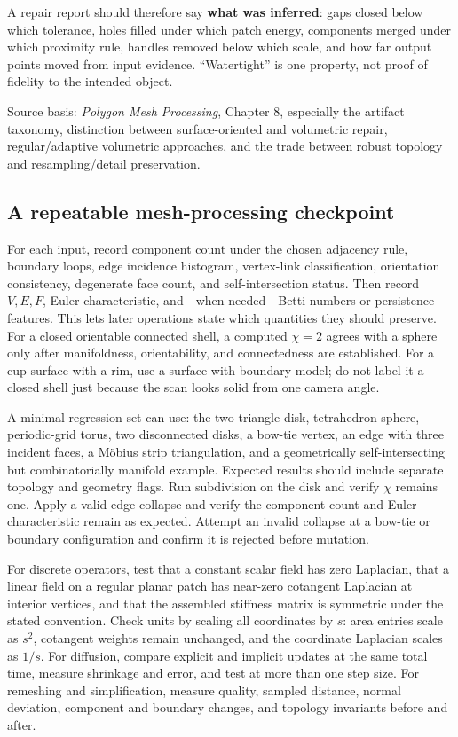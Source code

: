 A repair report should therefore say \textbf{what was inferred}: gaps closed below which tolerance, holes filled under which patch energy, components merged under which proximity rule, handles removed below which scale, and how far output points moved from input evidence. ``Watertight'' is one property, not proof of fidelity to the intended object.

Source basis: \emph{Polygon Mesh Processing}, Chapter 8, especially the artifact taxonomy, distinction between surface-oriented and volumetric repair, regular/adaptive volumetric approaches, and the trade between robust topology and resampling/detail preservation.

\subsection{A repeatable mesh-processing checkpoint}\label{03-visual-computing-i-ch002-a-repeatable-mesh-processing-checkpoint}

\hypertarget{03-visual-computing-i-ch002-a-repeatable-mesh-processing-checkpoint}{}

For each input, record component count under the chosen adjacency rule, boundary loops, edge incidence histogram, vertex-link classification, orientation consistency, degenerate face count, and self-intersection status. Then record \(V,E,F\), Euler characteristic, and---when needed---Betti numbers or persistence features. This lets later operations state which quantities they should preserve. For a closed orientable connected shell, a computed \(\chi=2\) agrees with a sphere only after manifoldness, orientability, and connectedness are established. For a cup surface with a rim, use a surface-with-boundary model; do not label it a closed shell just because the scan looks solid from one camera angle.

A minimal regression set can use: the two-triangle disk, tetrahedron sphere, periodic-grid torus, two disconnected disks, a bow-tie vertex, an edge with three incident faces, a Möbius strip triangulation, and a geometrically self-intersecting but combinatorially manifold example. Expected results should include separate topology and geometry flags. Run subdivision on the disk and verify \(\chi\) remains one. Apply a valid edge collapse and verify the component count and Euler characteristic remain as expected. Attempt an invalid collapse at a bow-tie or boundary configuration and confirm it is rejected before mutation.

For discrete operators, test that a constant scalar field has zero Laplacian, that a linear field on a regular planar patch has near-zero cotangent Laplacian at interior vertices, and that the assembled stiffness matrix is symmetric under the stated convention. Check units by scaling all coordinates by \(s\): area entries scale as \(s^2\), cotangent weights remain unchanged, and the coordinate Laplacian scales as \(1/s\). For diffusion, compare explicit and implicit updates at the same total time, measure shrinkage and error, and test at more than one step size. For remeshing and simplification, measure quality, sampled distance, normal deviation, component and boundary changes, and topology invariants before and after.

